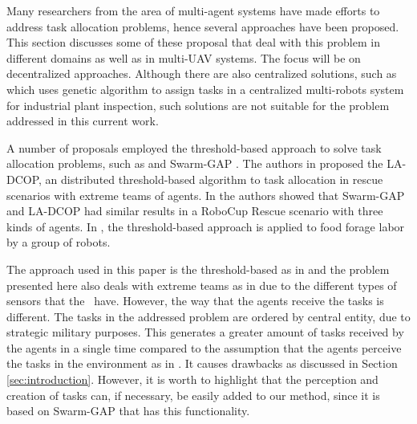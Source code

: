 Many researchers from the area of multi-agent systems have made efforts to address task allocation problems, hence several approaches have been proposed. This section discusses some of these proposal that deal with this problem in different domains as well as in multi-UAV systems. The focus will be on decentralized approaches. Although there are also centralized solutions, such as \cite{jose2016task} which uses genetic algorithm to assign tasks in a centralized multi-robots system for industrial plant inspection, such solutions are not suitable for the problem addressed in this current work.

A number of proposals employed the threshold-based approach to solve task allocation problems, such as \cite{scerri2005allocatingLADCOP,ferreira2010robocup,ikemoto2010adaptive} and Swarm-GAP \cite{ferreira2007swarm}. The authors in \cite{scerri2005allocatingLADCOP} proposed the LA-DCOP, an distributed threshold-based algorithm to task allocation in rescue scenarios with extreme teams of agents. In \cite{ferreira2010robocup} the authors showed that Swarm-GAP \cite{ferreira2007swarm} and LA-DCOP \cite{scerri2005allocatingLADCOP} had similar results in a RoboCup Rescue scenario with three kinds of agents. In \cite{ikemoto2010adaptive}, the threshold-based approach is applied to food forage labor by a group of robots.

The approach used in this paper is the threshold-based as in \cite{ferreira2007swarm,scerri2005allocatingLADCOP,ferreira2010robocup,ikemoto2010adaptive} and the problem presented here also deals with extreme teams as in \cite{scerri2005allocatingLADCOP, ferreira2010robocup} due to the different types of sensors that the \uavs\ have. However, the way that the agents receive the tasks is different. The tasks in the addressed problem are ordered by central entity, due to strategic military purposes. This generates a greater amount of tasks received by the agents in a single time compared to the assumption that the agents perceive the tasks in the environment as in \cite{ferreira2007swarm,scerri2005allocatingLADCOP, ferreira2010robocup,ikemoto2010adaptive}. It causes drawbacks as discussed in Section \ref{sec:introduction}. However, it is worth to highlight that the perception and creation of tasks can, if necessary, be easily added to our method, since it is based on Swarm-GAP that has this functionality.

